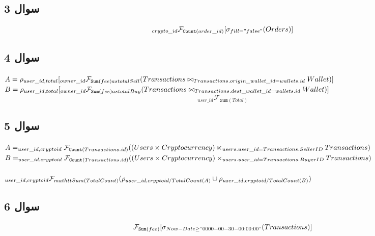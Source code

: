 \documentclass{book}
\begin{document}
        \subsection{سوال 3}
        $$_{crypto\_id} \mathcal{F}_{\mathtt{Count}(order\_id)} [\sigma_{fill = "false"} (Orders)]$$

        \subsection{سوال 4}

        $A = \rho_{user\_id, total}[ _{owner\_id} \mathcal{F}_{\mathtt{Sum}(fee) as totalSell} \newline( 
            Transactions \bowtie_{Transactions.origin\_wallet\_id = wallets.id} Wallet
        )]$\\
        $B = \rho_{user\_id, total}[ _{owner\_id} \mathcal{F}_{\mathtt{Sum}(fee) as totalBuy} \newline( 
            Transactions \bowtie_{Transactions.dest\_wallet\_id = wallets.id} Wallet
        )]$
        $$_{user\_id}\mathcal{F}_{\mathtt{Sum}(Total)}$$


        \subsection{سوال 5}

        $A = _{user\_id, cryptoid} \mathcal{F}_{\mathtt{Count}(Transactions.id)}(\\(Users \times Cryptocurrency) \ltimes_{users.user\_id = Transactions.SellerID} \\Transactions)$\\

        $B = _{user\_id, cryptoid} \mathcal{F}_{\mathtt{Count}(Transactions.id)}(\\(Users \times Cryptocurrency) \ltimes_{users.user\_id = Transactions.BuyerID}\\ Transactions)$\\
        \quad\\
        $_{user\_id, cryptoid} \mathcal{F}_{mathtt{Sum}(TotalCount)} (\\\rho_{user\_id, cryptoid/ TotalCount(A)} \cup \rho_{user\_id, cryptoid/ TotalCount(B)} )$

        \subsection{سوال 6}
        $$\mathcal{F}_{\mathtt{Sum}(fee)}[\sigma_{Now-Date \geq "0000-00-30-00:00:00"}(Transactions)]$$
\end{document}
